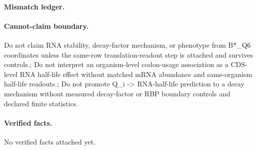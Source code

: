 \paragraph{Mismatch ledger.}
\paragraph{Cannot-claim boundary.} Do not claim RNA stability, decay-factor mechanism, or phenotype from B*\_Q6 coordinates unless the same-row translation-readout step is attached and survives controls.; Do not interpret an organism-level codon-usage association as a CDS-level RNA half-life effect without matched mRNA abundance and same-organism half-life readouts.; Do not promote Q\_i -> RNA-half-life prediction to a decay mechanism without measured decay-factor or RBP boundary controls and declared finite statistics.

\paragraph{Verified facts.}
No verified facts attached yet.
